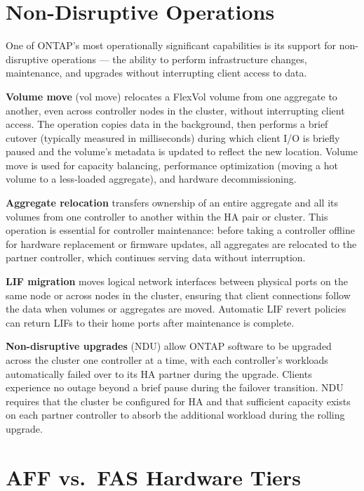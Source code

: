 \section{Non-Disruptive Operations}

One of ONTAP's most operationally significant capabilities is its support for non-disruptive operations --- the ability to perform infrastructure changes, maintenance, and upgrades without interrupting client access to data.

\textbf{Volume move} (vol move) relocates a FlexVol volume from one aggregate to another, even across controller nodes in the cluster, without interrupting client access. The operation copies data in the background, then performs a brief cutover (typically measured in milliseconds) during which client I/O is briefly paused and the volume's metadata is updated to reflect the new location. Volume move is used for capacity balancing, performance optimization (moving a hot volume to a less-loaded aggregate), and hardware decommissioning.

\textbf{Aggregate relocation} transfers ownership of an entire aggregate and all its volumes from one controller to another within the HA pair or cluster. This operation is essential for controller maintenance: before taking a controller offline for hardware replacement or firmware updates, all aggregates are relocated to the partner controller, which continues serving data without interruption.

\textbf{LIF migration} moves logical network interfaces between physical ports on the same node or across nodes in the cluster, ensuring that client connections follow the data when volumes or aggregates are moved. Automatic LIF revert policies can return LIFs to their home ports after maintenance is complete.

\textbf{Non-disruptive upgrades} (NDU) allow ONTAP software to be upgraded across the cluster one controller at a time, with each controller's workloads automatically failed over to its HA partner during the upgrade. Clients experience no outage beyond a brief pause during the failover transition. NDU requires that the cluster be configured for HA and that sufficient capacity exists on each partner controller to absorb the additional workload during the rolling upgrade.

\section{AFF vs.\ FAS Hardware Tiers}

